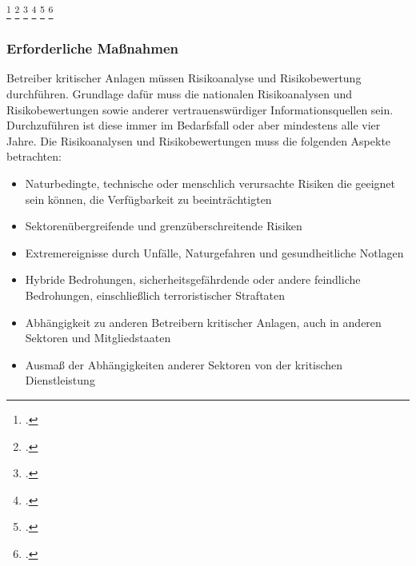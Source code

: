 \documentclass[11pt,a4paper,hidelinks]{article}   %
\begin{document}
{                    \footcite[Vgl.][, §2]{KRITIS-DachG}
                    \footcite[Vgl.][, §3, Absatz 1]{KRITIS-DachG}
                    \footcite[Vgl.][, §4, Absatz 1]{KRITIS-DachG}
                    \footcite[Vgl.][, §46, Absatz 1]{KRITIS-DachG}
                    \footcite[Vgl.][, §18, Absatz 1]{KRITIS-DachG}
                    \footcite[Vgl.][, §16, Absatz 1]{KRITIS-DachG}
                }
            \subsubsection{Erforderliche Maßnahmen}
                Betreiber kritischer Anlagen müssen Risikoanalyse und Risikobewertung durchführen. Grundlage dafür muss die nationalen Risikoanalysen und Risikobewertungen sowie anderer vertrauenswürdiger Informationsquellen sein. Durchzuführen ist diese immer im Bedarfsfall oder aber mindestens alle vier Jahre. Die Risikoanalysen und Risikobewertungen muss die folgenden Aspekte betrachten:
                \begin{itemize}
                    \item Naturbedingte, technische oder menschlich verursachte Risiken die geeignet sein können, die Verfügbarkeit zu beeinträchtigten
                    \item Sektorenübergreifende und grenzüberschreitende Risiken
                    \item Extremereignisse durch Unfälle, Naturgefahren und gesundheitliche Notlagen
                    \item Hybride Bedrohungen, sicherheitsgefährdende oder andere feindliche Bedrohungen, einschließlich terroristischer Straftaten
                    \item Abhängigkeit zu anderen Betreibern kritischer Anlagen, auch in anderen Sektoren und Mitgliedstaaten
                    \item Ausmaß der Abhängigkeiten anderer Sektoren von der kritischen Dienstleistung
                \end{itemize}
\end{document}
